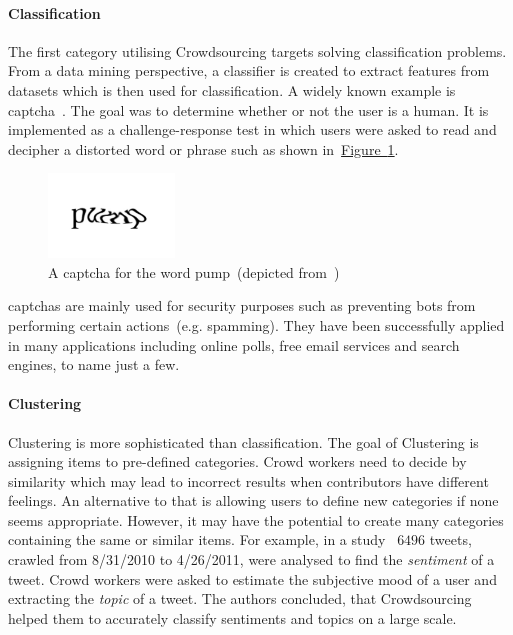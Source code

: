 \paragraph{Classification} The first category utilising Crowdsourcing targets solving classification problems. From a data mining perspective, a classifier is created to extract features from datasets which is then used for classification. A widely known example is \gls{captcha}~\cite{ahn2003}. The goal was to determine whether or not the user is a human. 
It is implemented as a challenge-response test in which users were asked to read and decipher a distorted word or phrase such as shown in~\hyperref[fig:captcha]{Figure~\ref*{fig:captcha}}.
\begin{figure}
	 \centering
	 \includegraphics[width=0.3\textwidth]{drawio/CAPCHA}
	 \caption{A \gls{captcha} for the word \guillemotright pump\guillemotleft~(depicted from~\cite{ahn2003})}\label{fig:captcha}
\end{figure}  
\gls{captcha}s are mainly used for security purposes such as preventing bots from performing certain actions~(e.g. spamming). They have been successfully applied in many applications including online polls, free email services and search engines, to name just a few. 

\paragraph{Clustering} Clustering is more sophisticated than classification. The goal of Clustering is assigning items to
pre-defined categories. Crowd workers need to decide by similarity which may lead to incorrect results when contributors have different feelings. An alternative to that is allowing users to define new categories if none seems appropriate. However, it may have the potential to create many categories containing the same or similar items. For example, in a study~\cite{huang2013} $6496$ tweets, crawled from 8/31/2010 to 4/26/2011, were analysed to find the \emph{sentiment} of a tweet. Crowd workers were asked to estimate the subjective mood of a user and extracting the \emph{topic} of a tweet. The authors concluded, that Crowdsourcing helped them to accurately classify sentiments and topics on a large scale. 

